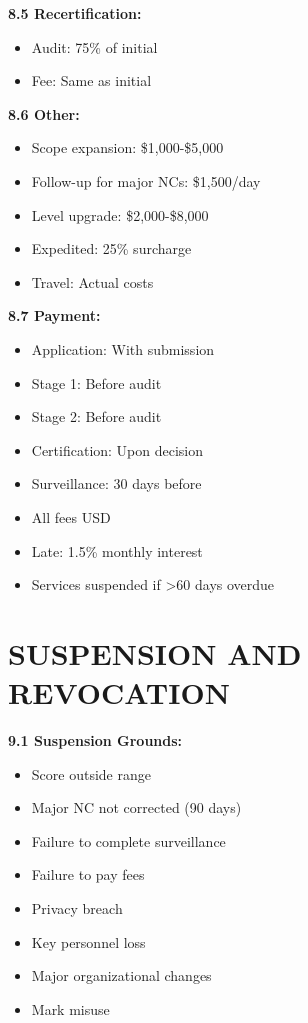 \documentclass[11pt,a4paper]{article}
\begin{document}
\textbf{8.5 Recertification:}
\begin{itemize}
\item Audit: 75\% of initial
\item Fee: Same as initial
\end{itemize}

\textbf{8.6 Other:}
\begin{itemize}
\item Scope expansion: \$1,000-\$5,000
\item Follow-up for major NCs: \$1,500/day
\item Level upgrade: \$2,000-\$8,000
\item Expedited: 25\% surcharge
\item Travel: Actual costs
\end{itemize}

\textbf{8.7 Payment:}
\begin{itemize}
\item Application: With submission
\item Stage 1: Before audit
\item Stage 2: Before audit
\item Certification: Upon decision
\item Surveillance: 30 days before
\item All fees USD
\item Late: 1.5\% monthly interest
\item Services suspended if >60 days overdue
\end{itemize}

\section{SUSPENSION AND REVOCATION}

\textbf{9.1 Suspension Grounds:}
\begin{itemize}
\item Score outside range
\item Major NC not corrected (90 days)
\item Failure to complete surveillance
\item Failure to pay fees
\item Privacy breach
\item Key personnel loss
\item Major organizational changes
\item Mark misuse
\end{itemize}
\end{document}
